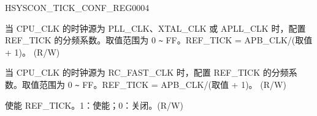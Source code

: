 \begin{register}{H}{SYSCON\_TICK\_CONF\_REG}{\hexprefix{}0004}\label{regdesc:SYSCONTICKCONFREG}
%
%
%
%
\regnewline%
\begin{regdesc}\begin{reglist}
\label{fielddesc:SYSCONXTALTICKNUM}\item [SYSCON\_XTAL\_TICK\_NUM] 当 CPU\_CLK 的时钟源为 PLL\_CLK、XTAL\_CLK 或 APLL\_CLK 时，配置 REF\_TICK 的分频系数。取值范围为 \hexprefix{}0 \verb+~+ \hexprefix{}FF。REF\_TICK = APB\_CLK/(取值 + 1)。 (R/W)
\label{fielddesc:SYSCONCK8MTICKNUM}\item [SYSCON\_CK8M\_TICK\_NUM] 当 CPU\_CLK 的时钟源为 RC\_FAST\_CLK 时，配置 REF\_TICK 的分频系数。取值范围为 \hexprefix{}0 \verb+~+ \hexprefix{}FF。REF\_TICK = APB\_CLK/(取值 + 1)。 (R/W)
\label{fielddesc:SYSCONXTALTICKENABLE}\item [SYSCON\_TICK\_ENABLE] 使能 REF\_TICK。1：使能；0：关闭。(R/W)
\end{reglist}\end{regdesc}
\end{register}
